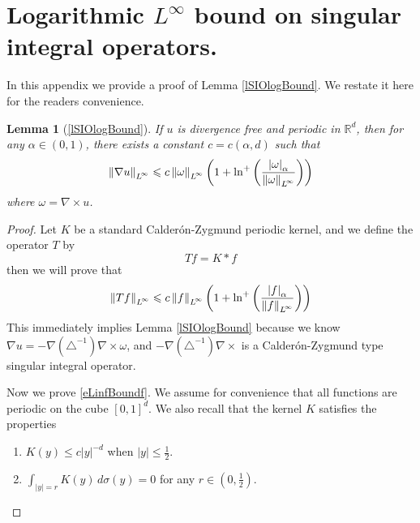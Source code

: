 \documentclass[final]{amsart}%
\newcommand{\lap}{\triangle}
\newcommand{\inv}{^{-1}}
\newcommand{\grad}{\nabla}
\newcommand{\curl}{\grad \times}
\renewcommand{\leq}{\leqslant}
\newcommand{\R}{\mathbb{R}}
\newif\iftextstyle
\newcommand{\abs}[1]{\iftextstyle\lvert#1\rvert\else\left\lvert#1\right\rvert\fi}
\newcommand{\norm}[1]{\iftextstyle\lVert#1\rVert\else\left\lVert#1\right\rVert\fi}
\newcommand{\holdersnorm}[2]{\abs{#1}_{#2}}
\newcommand{\lpnorm}[2]{\norm{#1}_{\smash{L^{\!#2}_{\vphantom{h}}}\vphantom{L^{\!#2}}}}
\newcommand{\linfnorm}[1]{\lpnorm{#1}{\infty}}
\numberwithin{equation}{section}
\newtheorem*{lemma*}{Lemma}
\theoremstyle{definition}
\theoremstyle{remark}
\begin{document}
\section{Logarithmic \texorpdfstring{$L^\infty$}{L-infinity} bound on
  singular integral operators.}\label{aSIOlogBound}%
In this appendix we provide a proof of Lemma \ref{lSIOlogBound}. We
restate it here for the readers convenience.
\begin{lemma*}[\ref{lSIOlogBound}]%
  If $u$ is divergence free and periodic in $\R^d$, then for any
  $\alpha \in (0,1)$, there exists a constant $c = c(\alpha, d)$ such
  that
$$
\linfnorm{\grad u} \leq c \linfnorm{\omega} \left( 1 + \ln^+ \left(
    \frac{ \holdersnorm{\omega}{\alpha} }{ \linfnorm{\omega} } \right)
\right) 
$$
where $\omega = \curl u$.
\end{lemma*}%
\begin{proof}%
  Let $K$ be a standard Calder\'on-Zygmund periodic kernel, and we
  define the operator $T$ by
$$ Tf = K * f $$
then we will prove that
\begin{equation}\label{eLinfBoundf}
\linfnorm{T f} \leq c \linfnorm{f} \left( 1 + \ln^+ \left( \frac{ \holdersnorm{f}{\alpha} }{ \linfnorm{f} } \right) \right)
\end{equation}
This immediately implies Lemma \ref{lSIOlogBound} because we know
$\grad u = -\grad (\lap\inv) \curl \omega$, and $-\grad (\lap\inv)
\curl$ is a Calder\'on-Zygmund type singular integral operator.

Now we prove \eqref{eLinfBoundf}. We assume for convenience that all
functions are periodic on the cube $[0,1]^d$. We also recall that the
kernel $K$ satisfies the properties
\begin{enumerate}
\item\label{aKdecay} $K(y) \leq c \abs{y}^{-d}$ when $\abs{y} \leq \frac{1}{2}$.
\item\label{aKcancellation} $\int_{\abs y = r} K(y) \, d\sigma(y) = 0$
  for any $r \in (0,\frac{1}{2})$.
\end{enumerate}


\end{proof}
\end{document}
